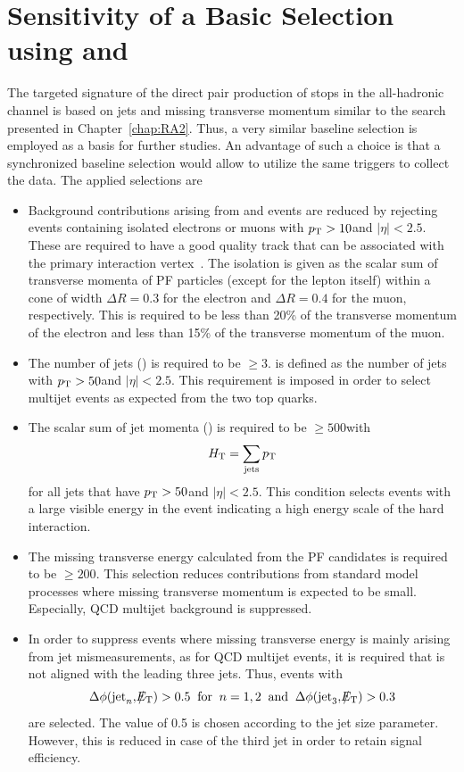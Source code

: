 \section{Sensitivity of a Basic Selection using \HT and \met}
\label{sec:stop_baseline}
The targeted signature of the direct pair production of stops in the all-hadronic channel is based on jets and missing transverse momentum similar to the search presented in Chapter~\ref{chap:RA2}. Thus, a very similar baseline selection is employed as a basis for further studies. An advantage of such a choice is that a synchronized baseline selection would allow to utilize the same triggers to collect the data. The applied selections are
\begin{itemize}
 \item{Background contributions arising from \ttbar and \WJets events are reduced by rejecting events containing isolated electrons or muons with $p_{\text{T}} > 10$\gev and $|\eta| < 2.5$. These are required to have a good quality track that can be associated with the primary interaction vertex~\cite{CMS-PAS-EGM-10-004, CMS-PAS-MUO-10-002}. The isolation is given as the scalar sum of transverse momenta of PF particles (except for the lepton itself) within a cone of width $\Delta R = 0.3$ for the electron and $\Delta R = 0.4$ for the muon, respectively. This is required to be less than 20\% of the transverse momentum of the electron and less than 15\% of the transverse momentum of the muon.}
 \item{The number of jets (\NJets) is required to be $\ge 3$. \NJets is defined as the number of jets with $p_{\text{T}} > 50$\gev and $|\eta| < 2.5$. This requirement is imposed in order to select multijet events as expected from the two top quarks.}
 \item{The scalar sum of jet momenta (\HT) is required to be $\ge 500$\gev with 
\begin{equation*}
H_{\text{T}} = \sum_{\mathrm{jets}} p_{\text{T}} 
\end{equation*}
for all jets that have $p_{\text{T}} > 50$\gev and $|\eta| < 2.5$. This condition selects events with a large visible energy in the event indicating a high energy scale of the hard interaction.}   
 \item{The missing transverse energy \met calculated from the PF candidates is required to be $\ge 200$\gev. This selection reduces contributions from standard model processes where missing transverse momentum is expected to be small. Especially, QCD multijet background is suppressed. } 
 \item{In order to suppress events where missing transverse energy is mainly arising from jet mismeasurements, as for QCD multijet events, it is required that \met is not aligned with the leading three jets. Thus, events with
\begin{equation*}
\Delta \phi(\mathrm{jet}_n, \slash\mkern-12mu{E}_{\text{T}}) > 0.5 \;\; \mathrm{for} \;\; n = 1,2 \;\; \mathrm{and} \;\; \Delta \phi(\mathrm{jet}_3, \slash\mkern-12mu{E}_{\text{T}}) > 0.3
\end{equation*} 
are selected. The value of 0.5 is chosen according to the jet size parameter. However, this is reduced in case of the third jet in order to retain signal efficiency. }
\end{itemize}
